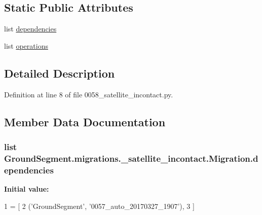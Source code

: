 \subsection*{Static Public Attributes}
\begin{DoxyCompactItemize}
\item 
list \hyperlink{class_ground_segment_1_1migrations_1_10058__satellite__incontact_1_1_migration_aa7276cdd489e2d113a2fbd32eafdc870}{dependencies}
\item 
list \hyperlink{class_ground_segment_1_1migrations_1_10058__satellite__incontact_1_1_migration_a26d6637573e44638a98749b847ba469e}{operations}
\end{DoxyCompactItemize}


\subsection{Detailed Description}


Definition at line 8 of file 0058\+\_\+satellite\+\_\+incontact.\+py.



\subsection{Member Data Documentation}
\hypertarget{class_ground_segment_1_1migrations_1_10058__satellite__incontact_1_1_migration_aa7276cdd489e2d113a2fbd32eafdc870}{}
\subsubsection[{dependencies}]{\setlength{\rightskip}{0pt plus 5cm}list Ground\+Segment.\+migrations.\+\_\+satellite\+\_\+incontact.\+Migration.\+dependencies\hspace{0.3cm}{\ttfamily [static]}}\label{class_ground_segment_1_1migrations_1_10058__satellite__incontact_1_1_migration_aa7276cdd489e2d113a2fbd32eafdc870}
{\bfseries Initial value\+:}
\begin{DoxyCode}
1 = [
2         (\textcolor{stringliteral}{'GroundSegment'}, \textcolor{stringliteral}{'0057\_auto\_20170327\_1907'}),
3     ]
\end{DoxyCode}



